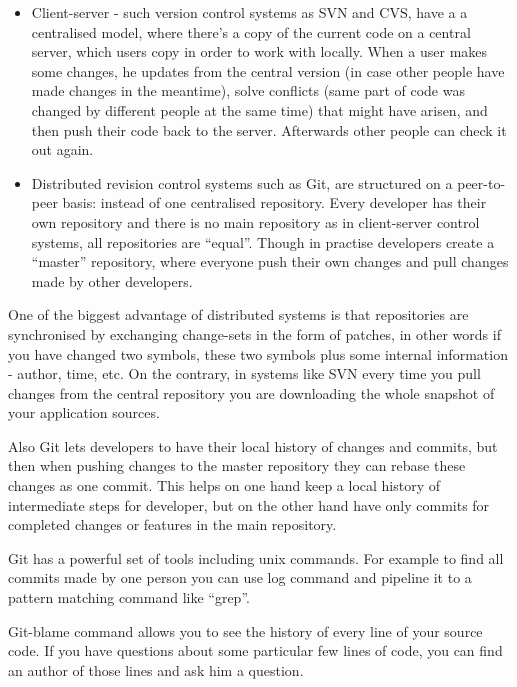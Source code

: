    \begin{itemize}
   \item Client-server - such version control systems as SVN and CVS, have a 
    a centralised model, where there's a copy of the current code on a central
    server, which users copy in order to work with locally. When a user makes
    some changes, he updates from the central version (in case other people have
    made changes in the meantime), solve conflicts (same part of code was
    changed by different people at the same time) that might have arisen, and
    then push their code back to the server. Afterwards other people can check
    it out again.

   \item Distributed revision control systems such as Git, are structured on a
    peer-to-peer basis: instead of one centralised repository. Every developer
    has their own repository and there is no main repository as in client-server
    control systems, all repositories are ``equal''. Though in practise developers
    create a ``master'' repository, where everyone push their own changes and pull
    changes made by other developers.
  \end{itemize}
  
  One of the biggest advantage of distributed systems is that repositories are
  synchronised by exchanging change-sets in the form of patches, in other words
  if you have changed two symbols, these two symbols plus some internal
  information - author, time, etc. On the contrary, in systems like SVN every
  time you pull changes from the central repository you are downloading 
  the whole snapshot of your application sources.
  
  Also Git lets developers to have their local history of changes and commits,
  but then when pushing changes to the master repository they can rebase these changes as one commit.
  This helps on one hand keep a local history of intermediate steps for
  developer, but on the other hand have only commits for completed changes
  or features in the main repository. 
  
  Git has a powerful set of tools including
  unix commands. For example to find all commits made by one person you can use
  log command and pipeline it to a pattern matching command like ``grep''.
  
   Git-blame command allows you to see the history of every line of your source
   code. If you have questions about some particular few lines of code,
   you can find an author of those lines and ask him a question.
   
